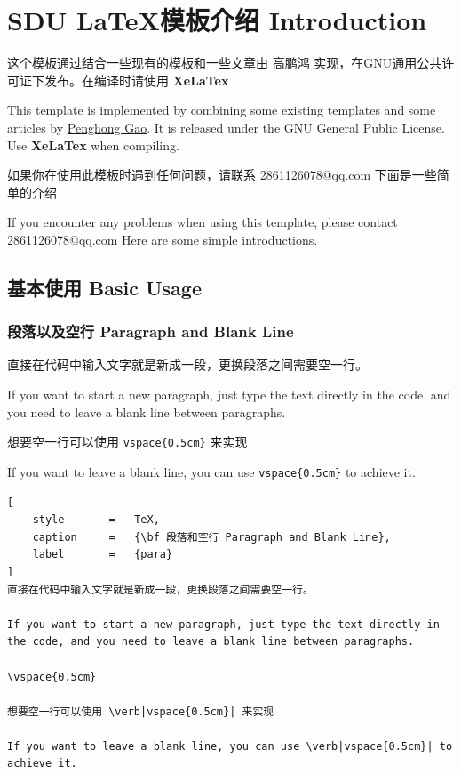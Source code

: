 \documentclass{article}
\begin{document}
\setcounter{page}{1}

\section{SDU \LaTeX 模板介绍 Introduction}

这个模板通过结合一些现有的模板和一些文章由 \href{https://github.com/AlmostGPH}{高鹏鸿} 实现，在GNU通用公共许可证下发布。在编译时请使用 {\bf XeLaTex}

\vspace{0.5cm}

This template is implemented by combining some existing templates and some articles by \href{https://github.com/AlmostGPH}{Penghong Gao}. It is released under the GNU General Public License. Use {\bf XeLaTex} when compiling.

\vspace{0.5cm}


如果你在使用此模板时遇到任何问题，请联系 \href{2861126078@qq.com}{2861126078@qq.com} 下面是一些简单的介绍
\vspace{0.5cm}

If you encounter any problems when using this template, please contact \href{2861126078@qq.com}{2861126078@qq.com} Here are some simple introductions.

\subsection{基本使用 Basic Usage}

\subsubsection{段落以及空行 Paragraph and Blank Line}

直接在代码中输入文字就是新成一段，更换段落之间需要空一行。

If you want to start a new paragraph, just type the text directly in the code, and you need to leave a blank line between paragraphs.

\vspace{0.5cm}

想要空一行可以使用 \verb|vspace{0.5cm}| 来实现

If you want to leave a blank line, you can use \verb|vspace{0.5cm}| to achieve it.

\begin{lstlisting}[
    style       =   TeX,
    caption     =   {\bf 段落和空行 Paragraph and Blank Line},
    label       =   {para}
]
直接在代码中输入文字就是新成一段，更换段落之间需要空一行。

If you want to start a new paragraph, just type the text directly in the code, and you need to leave a blank line between paragraphs.

\vspace{0.5cm}

想要空一行可以使用 \verb|vspace{0.5cm}| 来实现

If you want to leave a blank line, you can use \verb|vspace{0.5cm}| to achieve it.

\end{lstlisting}
\end{document}
